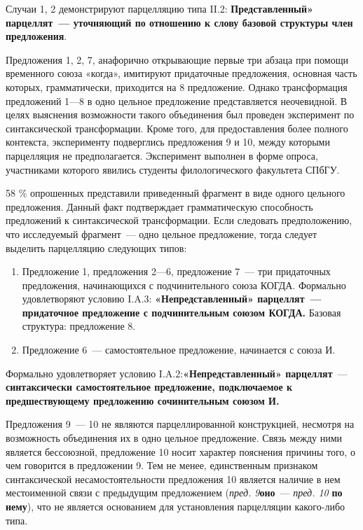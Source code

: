 \documentclass{kursa4}
\begin{document}
{{      Случаи 1, 2 демонстрируют парцелляцию типа II.2: \textbf{Представленный» парцеллят~--- уточняющий по отношению к слову базовой структуры член предложения}. 

      Предложения 1, 2, 7, анафорично открывающие первые три абзаца при помощи временного союза «когда», имитируют придаточные предложения, основная часть которых, грамматически, приходится на 8 предложение. Однако трансформация предложений 1—8 в одно цельное предложение представляется неочевидной. В целях выяснения возможности такого объединения был проведен эксперимент по синтаксической трансформации. Кроме того, для предоставления более полного контекста, эксперименту подверглись предложения 9 и 10, между которыми парцелляция не предполагается. Эксперимент выполнен в форме опроса, участниками которого явились студенты филологического факультета СПбГУ. 

      58 \% опрошенных представили приведенный фрагмент в виде одного цельного предложения. Данный факт подтверждает грамматическую способность предложений к синтаксической трансформации. Если следовать предположению, что исследуемый фрагмент~--- одно цельное предложение, тогда следует выделить парцелляцию следующих типов: 

      \begin{enumerate}
        \item Предложение 1, предложения 2—6,
        предложение 7~--- три придаточных предложения, начинающихся с
        подчинительного союза КОГДА. \newline
        Формально удовлетворяют условию I.A.3: \textbf{«Непредставленный» парцеллят~--- придаточное предложение с подчинительным союзом КОГДА.} Базовая структура: предложение 8.

        \item Предложение 6~--- самостоятельное предложение, начинается с союза И.
      \end{enumerate}

      Формально удовлетворяет условию I.A.2:\textbf{«Непредставленный» парцеллят}~--- \textbf{синтаксически самостоятельное
      предложение, подключаемое к предшествующему предложению сочинительным
      союзом И.}

      Предложения 9~--- 10 не являются парцеллированной конструкцией, несмотря на возможность объединения их в
      одно цельное предложение. Связь между ними является бессоюзной,
      предложение 10 носит характер пояснения причины того, о чем говорится в
      предложении 9. Тем не менее, единственным признаком синтаксической
      несамостоятельности предложения 10 является наличие в нем местоименной
      связи с предыдущим предложением
      (\textit{пред. 9}\textbf{оно}~--- \textit{пред. 10}{
      }\textbf{{по
      нему}}{), что не является основанием для
      установления парцелляции какого-либо типа.}

}}
\end{document}
